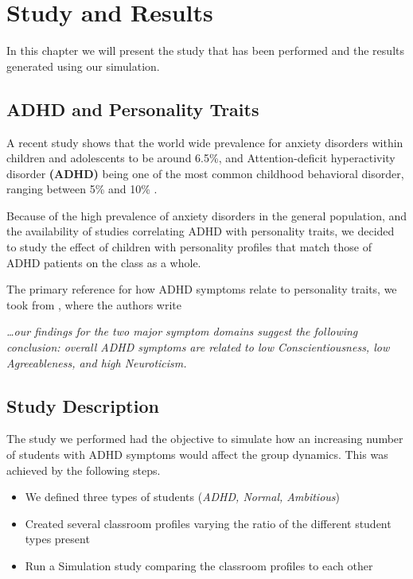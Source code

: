 \chapter{Study and Results}
In this chapter we will present the study that has been performed and the results
generated using our simulation.

\section{ADHD and Personality Traits}
A recent study \cite{Polanczyk2015} shows that the world wide prevalence
for anxiety disorders within children and adolescents to be around 6.5\%, and 
Attention-deficit hyperactivity disorder \textbf{(ADHD)}\cite{Barkley1997} being one
of the most common childhood behavioral disorder, ranging between 5\% and 10\% \cite{Sayal2018}.

\bb

Because of the high prevalence of anxiety disorders in the general population,
and the availability of studies correlating ADHD with personality traits, we
decided to study the effect of children with personality profiles that match those
of ADHD patients on the class as a whole.

\bb

The primary reference for how ADHD symptoms relate to personality traits, we took
from \cite{Nigg2002}, where the authors write

\textit{\dots our findings for the two major symptom domains suggest the following
conclusion: overall ADHD symptoms are related to low Conscientiousness, low Agreeableness, and high Neuroticism.}

\section{Study Description}
The study we performed had the objective to simulate how an increasing number of
students with ADHD symptoms would affect the group dynamics. This was achieved by
the following steps.

\begin{itemize}
    \item We defined three types of students (\textit{ADHD, Normal, Ambitious})
    \item Created several classroom profiles varying the ratio of the different student types present
    \item Run a Simulation study comparing the classroom profiles to each other
\end{itemize}

